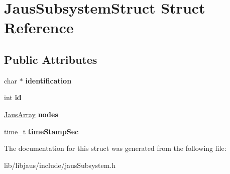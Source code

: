\hypertarget{struct_jaus_subsystem_struct}{\section{\-Jaus\-Subsystem\-Struct \-Struct \-Reference}
\label{struct_jaus_subsystem_struct}
}
\subsection*{\-Public \-Attributes}
\begin{DoxyCompactItemize}
\item 
\hypertarget{struct_jaus_subsystem_struct_a58e38bad81363241c7f86778be2f5f71}{char $\ast$ {\bfseries identification}}\label{struct_jaus_subsystem_struct_a58e38bad81363241c7f86778be2f5f71}

\item 
\hypertarget{struct_jaus_subsystem_struct_a51320e924fc538fc712425827b7b977b}{int {\bfseries id}}\label{struct_jaus_subsystem_struct_a51320e924fc538fc712425827b7b977b}

\item 
\hypertarget{struct_jaus_subsystem_struct_a13a1ecf5b1d017c67deaaff69be56839}{\hyperlink{struct_jaus_array_struct}{\-Jaus\-Array} {\bfseries nodes}}\label{struct_jaus_subsystem_struct_a13a1ecf5b1d017c67deaaff69be56839}

\item 
\hypertarget{struct_jaus_subsystem_struct_a071c0fc4b54a4742a051ed282a2e798c}{time\-\_\-t {\bfseries time\-Stamp\-Sec}}\label{struct_jaus_subsystem_struct_a071c0fc4b54a4742a051ed282a2e798c}

\end{DoxyCompactItemize}


\-The documentation for this struct was generated from the following file\-:\begin{DoxyCompactItemize}
\item 
lib/libjaus/include/jaus\-Subsystem.\-h\end{DoxyCompactItemize}
